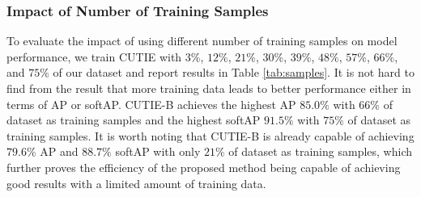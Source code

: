 \documentclass[10pt,twocolumn,letterpaper]{article}
\begin{document}
\subsubsection{Impact of Number of Training Samples}
To evaluate the impact of using different number of training samples on model performance, we train CUTIE with $3\%$, $12\%$, $21\%$, $30\%$, $39\%$, $48\%$, $57\%$, $66\%$, and $75\%$ of our dataset and report results in Table \ref{tab:samples}. It is not hard to find from the result that more training data leads to better performance either in terms of AP or softAP. CUTIE-B achieves the highest AP $85.0\%$ with $66\%$ of dataset as training samples and the highest softAP $91.5\%$ with $75\%$ of dataset as training samples. It is worth noting that CUTIE-B is already capable of achieving $79.6\%$ AP and $88.7\%$ softAP with only $21\%$ of dataset as training samples, which further proves the efficiency of the proposed method being capable of achieving good results with a limited amount of training data.
\end{document}
